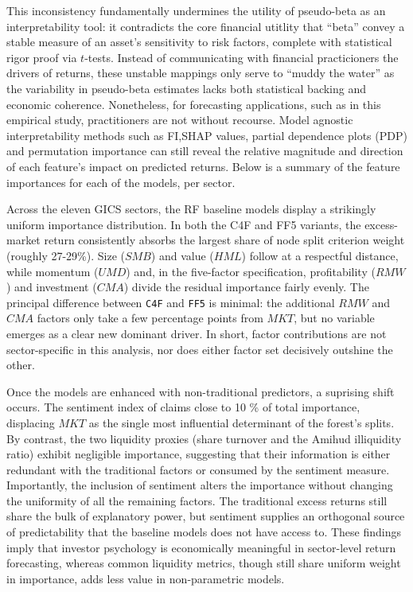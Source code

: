 This inconsistency fundamentally undermines the utility of pseudo-beta as an interpretability tool: it contradicts the core financial utitlity that “beta” convey a stable measure of an asset's sensitivity to risk factors, complete with statistical rigor proof via $t$-tests. Instead of communicating with financial practicioners the drivers of returns, these unstable mappings only serve to “muddy the water” as the variability in pseudo-beta estimates lacks both statistical backing and economic coherence. Nonetheless, for forecasting applications, such as in this empirical study, practitioners are not without recourse. Model agnostic interpretability methods such as FI,SHAP values, partial dependence plots (PDP) and permutation importance can still reveal the relative magnitude and direction of each feature's impact on predicted returns. Below is a summary of the feature importances for each of the models, per sector.

Across the eleven GICS sectors, the RF baseline models display a strikingly uniform importance distribution. In both the C4F and FF5 variants, the excess-market return consistently absorbs the largest share of node split criterion weight (roughly 27-29\%). Size ($SMB$) and value ($HML$) follow at a respectful distance, while momentum ($UMD$) and, in the five-factor specification, profitability ($RMW$) and investment ($CMA$) divide the residual importance fairly evenly. The principal difference between \texttt{C4F} and \texttt{FF5} is minimal: the additional $RMW$ and $CMA$ factors only take a few percentage points from $MKT$, but no variable emerges as a clear new dominant driver. In short, factor contributions are not sector-specific in this analysis, nor does either factor set decisively outshine the other.

Once the models are enhanced with non-traditional predictors, a suprising shift occurs. The sentiment index of  claims close to 10 \% of total importance, displacing $MKT$ as the single most influential determinant of the forest's splits. By contrast, the two liquidity proxies (share turnover and the Amihud illiquidity ratio) exhibit negligible importance, suggesting that their information is either redundant with the traditional factors or consumed by the sentiment measure. Importantly, the inclusion of sentiment alters the importance without changing the uniformity of all the remaining factors. The traditional excess returns still share the bulk of explanatory power, but sentiment supplies an orthogonal source of predictability that the baseline models does not have access to. These findings imply that investor psychology is economically meaningful in sector-level return forecasting, whereas common liquidity metrics, though still share uniform weight in importance, adds less value in non-parametric models.

